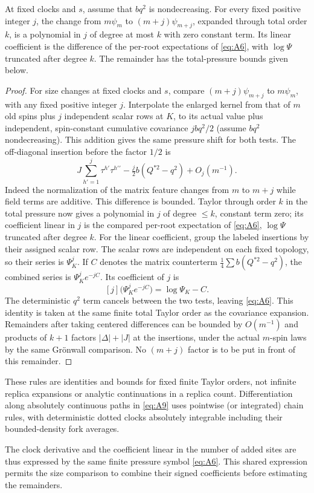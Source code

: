 \begin{lemma}
\label{found:size-increment}
At fixed clocks and \(s\), assume that \(bq^2\) is nondecreasing. For every fixed positive integer \(j\), the change from \(m\psi_m\) to \((m+j)\psi_{m+j}\), expanded through total order \(k\), is a polynomial in \(j\) of degree at most \(k\) with zero constant term. Its linear coefficient is the difference of the per-root expectations of \eqref{eq:A6}, with \(\log\Psi\) truncated after degree \(k\). The remainder has the total-pressure bounds given below.
\end{lemma}

\begin{proof}
For size changes at fixed clocks and \(s\), compare \((m+j)\psi_{m+j}\) to \(m\psi_m\), with any fixed positive integer \(j\). Interpolate the enlarged kernel from that of \(m\) old spins plus \(j\) independent scalar rows at \(K\), to its actual value plus independent, spin-constant cumulative covariance \(j b q^2/2\) (assume \(b q^2\) nondecreasing). This addition gives the same pressure shift for both tests. The off-diagonal insertion before the factor \(1/2\) is
\[
 J\sum_{h'=1}^j\tau^{h'}\tau^{h'\prime}
       -\tfrac j2 b(Q^{*2}-q^2)+O_j(m^{-1}).
\]
Indeed the normalization of the matrix feature changes from \(m\) to \(m+j\) while field terms are additive. This difference is bounded. Taylor through order \(k\) in the total pressure now gives a polynomial in \(j\) of degree \(\le k\), constant term zero; its coefficient linear in \(j\) is the compared per-root expectation of \eqref{eq:A6}, \(\log\Psi\) truncated after degree \(k\). For the linear coefficient, group the labeled insertions by their
assigned scalar row. The scalar rows are independent on each fixed
topology, so their series is \(\Psi_K^j\). If \(C\) denotes the
matrix counterterm \(\frac14\sum b(Q^{*2}-q^2)\), the combined series
is \(\Psi_K^j e^{-jC}\). Its coefficient of \(j\) is
\[
 [j]\big(\Psi_K^j e^{-jC}\big)=\log\Psi_K-C.
\]
The deterministic \(q^2\) term cancels between the two tests, leaving
\eqref{eq:A6}. This identity is taken at the same finite total Taylor
order as the covariance expansion. Remainders after taking centered differences can be bounded by \(O(m^{-1})\) and products of \(k+1\) factors \(|\Delta|+|J|\) at the insertions, under the actual \(m\)-spin laws by the same Gr\"onwall comparison. No \((m+j)\) factor is to be put in front of this remainder.
\end{proof}

These rules are identities and bounds for fixed finite Taylor orders, not infinite replica expansions or analytic continuations in a replica count. Differentiation along absolutely continuous paths in \eqref{eq:A9} uses pointwise (or integrated) chain rules, with deterministic dotted clocks absolutely integrable including their bounded-density fork averages.


The clock derivative and the coefficient linear in the number of added
sites are thus expressed by the same finite pressure symbol
\eqref{eq:A6}. This shared expression permits the size comparison to
combine their signed coefficients before estimating the remainders.
